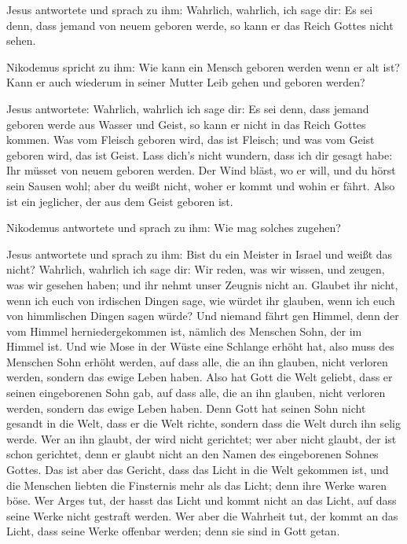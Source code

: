  Jesus antwortete und sprach zu ihm: Wahrlich, wahrlich,
ich sage dir: Es sei denn, dass jemand von neuem geboren werde, so kann
er das Reich Gottes nicht sehen.

 Nikodemus spricht zu ihm: Wie kann ein Mensch geboren
werden wenn er alt ist? Kann er auch wiederum in seiner Mutter Leib
gehen und geboren werden?

 Jesus antwortete: Wahrlich, wahrlich ich sage dir: Es sei
denn, dass jemand geboren werde aus Wasser und Geist, so kann er nicht
in das Reich Gottes kommen.  Was vom Fleisch geboren wird,
das ist Fleisch; und was vom Geist geboren wird, das ist Geist.
 Lass dich's nicht wundern, dass ich dir gesagt habe: Ihr
müsset von neuem geboren werden.  Der Wind bläst, wo er
will, und du hörst sein Sausen wohl; aber du weißt nicht, woher er kommt
und wohin er fährt. Also ist ein jeglicher, der aus dem Geist geboren
ist.

 Nikodemus antwortete und sprach zu ihm: Wie mag solches
zugehen?

 Jesus antwortete und sprach zu ihm: Bist du ein Meister
in Israel und weißt das nicht?  Wahrlich, wahrlich ich
sage dir: Wir reden, was wir wissen, und zeugen, was wir gesehen haben;
und ihr nehmt unser Zeugnis nicht an.  Glaubet ihr nicht,
wenn ich euch von irdischen Dingen sage, wie würdet ihr glauben, wenn
ich euch von himmlischen Dingen sagen würde?  Und niemand
fährt gen Himmel, denn der vom Himmel herniedergekommen ist, nämlich des
Menschen Sohn, der im Himmel ist.  Und wie Mose in der
Wüste eine Schlange erhöht hat, also muss des Menschen Sohn erhöht
werden,  auf dass alle, die an ihn glauben, nicht
verloren werden, sondern das ewige Leben haben.  Also hat
Gott die Welt geliebt, dass er seinen eingeborenen Sohn gab, auf dass
alle, die an ihn glauben, nicht verloren werden, sondern das ewige Leben
haben.  Denn Gott hat seinen Sohn nicht gesandt in die
Welt, dass er die Welt richte, sondern dass die Welt durch ihn selig
werde.  Wer an ihn glaubt, der wird nicht gerichtet; wer
aber nicht glaubt, der ist schon gerichtet, denn er glaubt nicht an den
Namen des eingeborenen Sohnes Gottes.  Das ist aber das
Gericht, dass das Licht in die Welt gekommen ist, und die Menschen
liebten die Finsternis mehr als das Licht; denn ihre Werke waren böse.
 Wer Arges tut, der hasst das Licht und kommt nicht an
das Licht, auf dass seine Werke nicht gestraft werden. 
Wer aber die Wahrheit tut, der kommt an das Licht, dass seine Werke
offenbar werden; denn sie sind in Gott getan.

